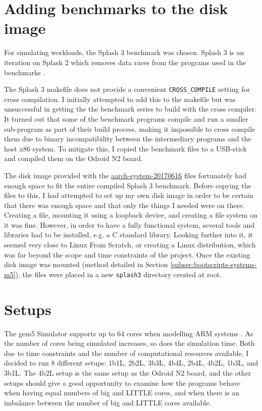 \section{Adding benchmarks to the disk image}
For simulating workloads, the Splash 3 benchmark \cite{sakalis_splash-3_2016} 
was chosen. Splash 3 is an iteration on Splash 2 which removes data races from 
the programs used in the benchmarks \cite{sakalis_splash-3_2016}.

The Splash 3 makefile does not provide a convenient \texttt{CROSS\_COMPILE} 
setting for cross compilation. I initially attempted to add this to the 
makefile but was unsuccessful in getting the the benchmark series to build with 
the cross compiler. It turned out that some of the benchmark programs compile 
and run a smaller sub-program as part of their build process, making it 
impossible to cross compile them due to binary incompatibility between the 
intermediary programs and the host x86 system. To mitigate this, I copied the 
benchmark files to a USB-stick and compiled them on the Odroid N2 board.

The disk image provided with the 
\href{http://dist.gem5.org/dist/current/arm/aarch-system-20170616.tar.xz}{aarch-system-20170616}
files fortunately had enough space to fit the entire compiled Splash 3 
benchmark. Before copying the files to this, I had attempted to set up my own 
disk image in order to be certain that there was enough space and that only the 
things I needed were on there. Creating a file, mounting it using a loopback 
device, and creating a file system on it was fine. However, in order to have a 
fully functional system, several tools and libraries had to be installed, e.g. 
a C standard library. Looking further into it, it seemed very close to Linux 
From Scratch, or creating a Linux distribution, which was far beyond the scope 
and time constraints of the project. Once the existing disk image was mounted 
(method detailed in Section \ref{subsec:bootscripts-systems-m5}), the files 
were placed in a new \texttt{splash3} directory created at root.

\section{Setups}
The gem5 Simulator supports up to 64 cores when modelling ARM systems 
\cite{noauthor_gem5_nodate}. As the number of cores being simulated increases, 
so does the simulation time. Both due to time constraints and the number of 
computational resources available, I decided to run 8 different setups: 1b1L, 
2b2L, 3b3L, 4b4L, 2b4L, 4b2L, 1b3L, and 3b1L. The 4b2L setup is the same setup 
as the Odroid N2 board, and the other setups should give a good opportunity to 
examine how the programs behave when having equal numbers of big and LITTLE 
cores, and when there is an imbalance between the number of big and LITTLE cores
available.

